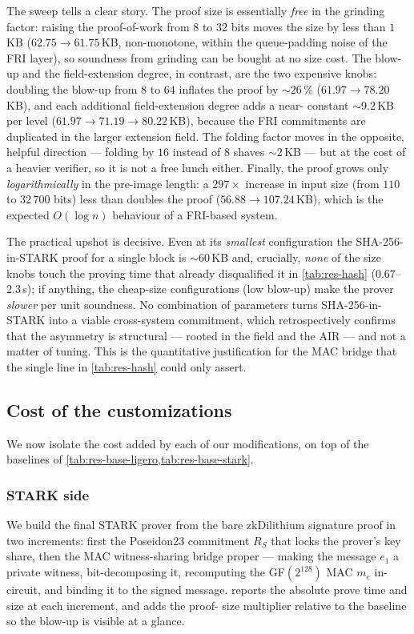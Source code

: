 \documentclass{article}
\begin{document}
The sweep tells a clear story. The proof size is essentially \emph{free} in the
grinding factor: raising the proof-of-work from $8$ to $32$ bits moves the size by
less than $1$\,KB ($62.75 \to 61.75$\,KB, non-monotone, within the queue-padding
noise of the FRI layer), so soundness from grinding can be bought at no size cost.
The blow-up and the field-extension degree, in contrast, are the two expensive
knobs: doubling the blow-up from $8$ to $64$ inflates the proof by $\sim$26\,\%
($61.97 \to 78.20$\,KB), and each additional field-extension degree adds a near-
constant $\sim$9.2\,KB per level ($61.97 \to 71.19 \to 80.22$\,KB), because the
FRI commitments are duplicated in the larger extension field. The folding factor
moves in the opposite, helpful direction --- folding by $16$ instead of $8$ shaves
$\sim$2\,KB --- but at the cost of a heavier verifier, so it is not a free lunch
either. Finally, the proof grows only \emph{logarithmically} in the pre-image
length: a $297\times$ increase in input size (from $110$ to $32\,700$ bits) less
than doubles the proof ($56.88 \to 107.24$\,KB), which is the expected
$O(\log n)$ behaviour of a FRI-based system.

The practical upshot is decisive. Even at its \emph{smallest} configuration the
SHA-256-in-STARK proof for a single block is $\sim$60\,KB and, crucially,
\emph{none} of the size knobs touch the proving time that already disqualified it
in \cref{tab:res-hash} ($0.67$--$2.3$\,s); if anything, the cheap-size
configurations (low blow-up) make the prover \emph{slower} per unit soundness. No
combination of parameters turns SHA-256-in-STARK into a viable cross-system
commitment, which retrospectively confirms that the asymmetry is structural ---
rooted in the field and the AIR --- and not a matter of tuning. This is the
quantitative justification for the MAC bridge that the single line in
\cref{tab:res-hash} could only assert.

\subsection{Cost of the customizations}
\label{results:customizations}
We now isolate the cost added by each of our modifications, on top of the
baselines of \cref{tab:res-base-ligero,tab:res-base-stark}.

\subsubsection{STARK side}
\label{results:cust-stark}
We build the final STARK prover from the bare zkDilithium signature proof in two
increments: first the Poseidon23 commitment $R_S$ that locks the prover's key
share, then the MAC witness-sharing bridge proper --- making the message $e_1$ a
private witness, bit-decomposing it, recomputing the GF$(2^{128})$ MAC $m_e$
in-circuit, and binding it to the signed message. 
reports the absolute prove time and size at each increment, and adds the proof-
size multiplier relative to the baseline so the blow-up is visible at a glance.
\end{document}
